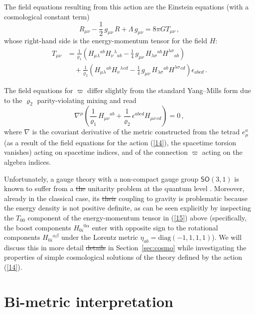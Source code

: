 \documentclass[11pt, a4paper]{article}
\newcommand{\lang}[1]{\textcolor{langfix}{#1}}
\newcommand{\subst}[1]{\textcolor{substantive}{#1}}
\newcommand{\rem}[1]{\textcolor{removeprop}{\sout{#1}}}
\def\SO{\mathsf{SO}}
\begin{document}
The field equations resulting from this action are \lang{the} Einstein equations (with \lang{a} cosmological constant term)
\begin{equation}\label{15a}
R_{\mu\nu}-\frac{1}{2}\, g_{\mu\nu}\, R +\Lambda\, g_{\mu\nu}= 8\pi G T_{\mu\nu}\,,
\end{equation}
whose right-hand side is the energy-momentum tensor for the field $H$:
\begin{align}
T_{\mu\nu} &= \frac{1}{\varrho_1}\left(H_{\mu\lambda}{}^{ab} H_\nu{}^\lambda{}_{ab} -
\frac{1}{4}\, g_{\mu\nu}\,H_{\lambda\sigma}{}^{ab}
H^{\lambda\sigma}{}_{ab}\right) \nonumber\\
&\quad +\frac{1}{\varrho_2}\left(H_{\mu\lambda}{}^{ab} H_\nu{}^\lambda{}^{cd} -
\frac{1}{4}\, g_{\mu\nu}\,H_{\lambda\sigma}{}^{ab}
H^{\lambda\sigma}{}^{cd}\right)\epsilon_{abcd}\,.\label{15}
\end{align}

The field equations for $\varpi$ differ slightly from the standard Yang--Mills form \subst{due to the $\varrho_2$ parity-violating mixing} and read
\begin{equation}\label{16}
\nabla^\mu \left(\frac{1}{\varrho_1}\, H_{\mu\nu}{}^{ab} +\frac{1}{\varrho_2}\,\epsilon^{abcd}
H_{\mu\nu\, cd}\right)=0\,,
\end{equation}
where $\nabla$ is the covariant derivative of the metric constructed from the tetrad $e^a_\mu$ (as a result of \lang{the} field equations for the action (\ref{14}), the spacetime torsion vanishes) acting on spacetime indices, and of \lang{the} connection $\varpi$ acting on the algebra indices.

Unfortunately, \lang{a} gauge theory with a non-compact gauge group \subst{$\SO(3,1)$} is known to suffer from \lang{a} \rem{the} unitarity problem at the quantum level \cite{Hsu:1980zt}. Moreover, already in the classical case, \lang{its} \rem{their} coupling to gravity is problematic because the energy density is not positive definite, as can be seen explicitly by inspecting the $T_{00}$ component of the energy-momentum tensor in (\ref{15}) above \subst{(specifically, the boost components $H_{0i}{}^{0\alpha}$ enter with opposite sign to the rotational components $H_{0i}{}^{\alpha\beta}$ under the Lorentz metric $\eta_{ab} = \mathrm{diag}(-1,1,1,1)$)}. We will discuss this in more \lang{detail} \rem{details} in Section~\ref{sec:cosmo} while investigating the properties of simple cosmological solutions of the theory defined by the action (\ref{14}).

\section{Bi-metric interpretation}
\end{document}
